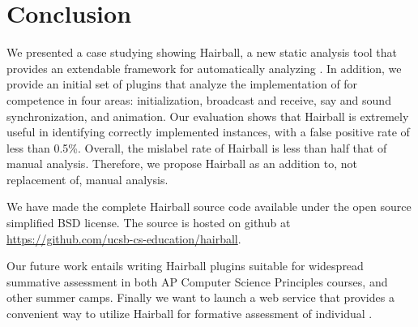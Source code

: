 \section{Conclusion} 

We presented a case studying showing Hairball, a new static analysis tool that
provides an extendable framework for automatically analyzing .  In
addition, we provide an initial set of plugins that analyze the implementation
of  for competence in four areas: initialization, broadcast and
receive, say and sound synchronization, and animation.  Our evaluation shows
that Hairball is extremely useful in identifying correctly implemented
instances, with a false positive rate of less than 0.5\%.  Overall, the
mislabel rate of Hairball is less than half that of manual analysis.
Therefore, we propose Hairball as an addition to, not replacement of, manual
analysis.

We have made the complete Hairball source code available under the open source
simplified BSD license. The source is hosted on github at\\
\url{https://github.com/ucsb-cs-education/hairball}.

Our future work entails writing Hairball plugins suitable for wide\-spread
summative assessment in both AP Computer Science Principles courses, and other
summer camps. Finally we want to launch a web service that provides a
convenient way to utilize Hairball for formative assessment of individual
.

